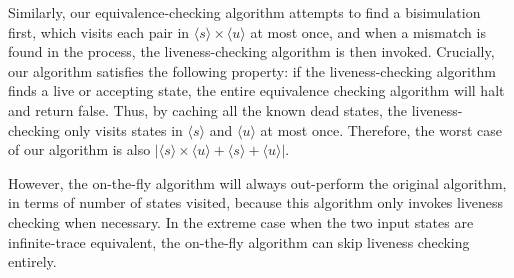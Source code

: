 \documentclass[conference]{IEEEtran}
\newcommand{\At}{\mathbf{At}}
\newcommand{\reject}{\mathinner{\mathrm{rej}}}
\newcommand{\accept}{\mathinner{\mathrm{acc}}}
\begin{document}
Similarly, our equivalence-checking algorithm attempts to find a bisimulation first, which visits each pair in \(⟨s⟩ × ⟨u⟩\) at most once, and when a mismatch is found in the process, the liveness-checking algorithm is then invoked.
Crucially, our algorithm satisfies the following property: if the liveness-checking algorithm finds a live or accepting state, the entire equivalence checking algorithm will halt and return false.
Thus, by caching all the known dead states, the liveness-checking only visits states in \(⟨s⟩\) and \(⟨u⟩\) at most once.
Therefore, the worst case of our algorithm is also \(|⟨s⟩ × ⟨u⟩ + ⟨s⟩ + ⟨u⟩|\).

However, the on-the-fly algorithm will always out-perform the original algorithm, in terms of number of states visited, because this algorithm only invokes liveness checking when necessary.
In the extreme case when the two input states are infinite-trace equivalent, the on-the-fly algorithm can skip liveness checking entirely.




\end{document}
